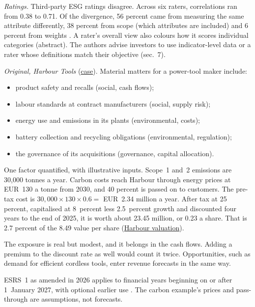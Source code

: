 \begin{qfmethod}
\emph{Ratings.} Third-party ESG ratings disagree. Across six raters, correlations ran from 0.38 to 0.71. Of the divergence, 56 percent came from measuring the same attribute differently, 38 percent from scope (which attributes are included) and 6 percent from weights \citep[abstract and sec.~1]{aggregate-confusion-2022}. A rater's overall view also colours how it scores individual categories (abstract). The authors advise investors to use indicator-level data or a rater whose definitions match their objective (sec.~7).

 \emph{Original, Harbour Tools} (\hyperref[ex:harbour-tools-statements]{case}). Material matters for a power-tool maker include:
\begin{itemize}
\item product safety and recalls (social, cash flows);
\item labour standards at contract manufacturers (social, supply risk);
\item energy use and emissions in its plants (environmental, costs);
\item battery collection and recycling obligations (environmental, regulation);
\item the governance of its acquisitions (governance, capital allocation).
\end{itemize}

One factor quantified, with illustrative inputs. Scope~1 and~2 emissions are 30,000 tonnes a year. Carbon costs reach Harbour through energy prices at EUR~130 a tonne from 2030, and 40 percent is passed on to customers. The pre-tax cost is $30{,}000\times130\times0.6=$ EUR~2.34 million a year. After tax at 25 percent, capitalised at 8~percent less 2.5~percent growth and discounted four years to the end of 2025, it is worth about 23.45 million, or 0.23 a share. That is 2.7 percent of the 8.49 value per share (\hyperref[meth:forecast-horizon-steady-state]{Harbour valuation}).

The exposure is real but modest, and it belongs in the cash flows. Adding a premium to the discount rate as well would count it twice. Opportunities, such as demand for efficient cordless tools, enter revenue forecasts in the same way.

 ESRS~1 as amended in 2026 applies to financial years beginning on or after 1~January 2027, with optional earlier use \citep[Arts.~2--3]{eu-2026-1563-esrs}. The carbon example's prices and pass-through are assumptions, not forecasts.


\end{qfmethod}
